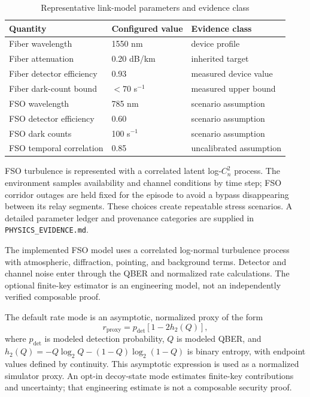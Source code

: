 \documentclass[journal]{IEEEtran}
\begin{document}
\begin{table}[t]
\caption{Representative link-model parameters and evidence class}
\label{tab:physical}
\centering
\scriptsize
\begin{tabular}{@{}p{}p{}p{}@{}}
\toprule
Quantity & Configured value & Evidence class\\
\midrule
Fiber wavelength & 1550 nm & device profile\\
Fiber attenuation & 0.20 dB/km & inherited target\\
Fiber detector efficiency & 0.93 & measured device value\\
Fiber dark-count bound & $<70$ s$^{-1}$ & measured upper bound\\
FSO wavelength & 785 nm & scenario assumption\\
FSO detector efficiency & 0.60 & scenario assumption\\
FSO dark counts & 100 s$^{-1}$ & scenario assumption\\
FSO temporal correlation & 0.85 & uncalibrated assumption\\
\bottomrule
\end{tabular}
\end{table}

FSO turbulence is represented with a correlated latent log-$C_n^2$ process. The environment samples availability and channel conditions by time step; FSO corridor outages are held fixed for the episode to avoid a bypass disappearing between its relay segments. These choices create repeatable stress scenarios. A detailed parameter ledger and provenance categories are supplied in \texttt{PHYSICS\_EVIDENCE.md}.

The implemented FSO model uses a correlated log-normal turbulence process with atmospheric, diffraction, pointing, and background terms. Detector and channel noise enter through the QBER and normalized rate calculations. The optional finite-key estimator is an engineering model, not an independently verified composable proof.

The default rate mode is an asymptotic, normalized proxy of the form
\begin{equation}
 r_{\mathrm{proxy}} = p_{\mathrm{det}}\left[1-2h_2(Q)\right],
 \label{eq:proxy}
\end{equation}
where $p_{\mathrm{det}}$ is modeled detection probability, $Q$ is modeled QBER, and $h_2(Q)=-Q\log_2 Q-(1-Q)\log_2(1-Q)$ is binary entropy, with endpoint values defined by continuity. This asymptotic expression is used as a normalized simulator proxy. An opt-in decoy-state mode estimates finite-key contributions and uncertainty; that engineering estimate is not a composable security proof.
\end{document}
